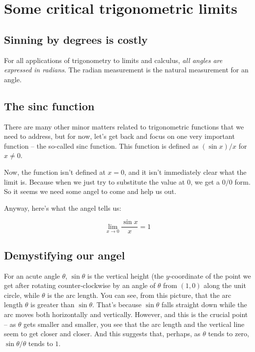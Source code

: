 \documentclass[10pt]{amsart}
\begin{document}
\section{Some critical trigonometric limits}

\subsection*{Sinning by degrees is costly}

For all applications of trigonometry to limits and calculus, {\em all
angles are expressed in radians}. The radian measurement is the
natural measurement for an angle.

\subsection{The sinc function}

There are many other minor matters related to trigonometric functions
that we need to address, but for now, let's get back and focus on one
very important function -- the so-called sinc function. This function
is defined as $(\sin x)/x$ for $x \ne 0$.

Now, the function isn't defined at $x = 0$, and it isn't immediately
clear what the limit is. Because when we just try to substitute the
value at $0$, we get a $0/0$ form. So it seems we need some angel to
come and help us out.

Anyway, here's what the angel tells us:

$$\lim_{x \to 0} \frac{\sin x}{x} = 1$$

\subsection{Demystifying our angel}

For an acute angle $\theta$, $\sin \theta$ is the vertical height (the
$y$-coordinate of the point we get after rotating counter-clockwise by
an angle of $\theta$ from $(1,0)$ along the unit circle, while
$\theta$ is the arc length. You can see, from this picture, that the
arc length $\theta$ is greater than $\sin \theta$. That's because
$\sin \theta$ falls straight down while the arc moves both
horizontally and vertically. However, and this is the crucial point --
as $\theta$ gets smaller and smaller, you see that the arc length and
the vertical line seem to get closer and closer. And this suggests
that, perhaps, as $\theta$ tends to zero, $\sin \theta/\theta$ tends
to $1$.
\end{document}
